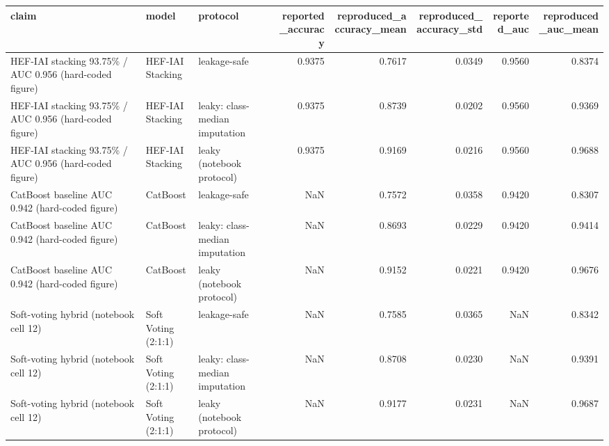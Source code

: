 \begin{tabular}{lllrrrrr}
\toprule
claim & model & protocol & reported\_accuracy & reproduced\_accuracy\_mean & reproduced\_accuracy\_std & reported\_auc & reproduced\_auc\_mean \\
\midrule
HEF-IAI stacking 93.75\% / AUC 0.956 (hard-coded figure) & HEF-IAI Stacking & leakage-safe & 0.9375 & 0.7617 & 0.0349 & 0.9560 & 0.8374 \\
HEF-IAI stacking 93.75\% / AUC 0.956 (hard-coded figure) & HEF-IAI Stacking & leaky: class-median imputation & 0.9375 & 0.8739 & 0.0202 & 0.9560 & 0.9369 \\
HEF-IAI stacking 93.75\% / AUC 0.956 (hard-coded figure) & HEF-IAI Stacking & leaky (notebook protocol) & 0.9375 & 0.9169 & 0.0216 & 0.9560 & 0.9688 \\
CatBoost baseline AUC 0.942 (hard-coded figure) & CatBoost & leakage-safe & NaN & 0.7572 & 0.0358 & 0.9420 & 0.8307 \\
CatBoost baseline AUC 0.942 (hard-coded figure) & CatBoost & leaky: class-median imputation & NaN & 0.8693 & 0.0229 & 0.9420 & 0.9414 \\
CatBoost baseline AUC 0.942 (hard-coded figure) & CatBoost & leaky (notebook protocol) & NaN & 0.9152 & 0.0221 & 0.9420 & 0.9676 \\
Soft-voting hybrid (notebook cell 12) & Soft Voting (2:1:1) & leakage-safe & NaN & 0.7585 & 0.0365 & NaN & 0.8342 \\
Soft-voting hybrid (notebook cell 12) & Soft Voting (2:1:1) & leaky: class-median imputation & NaN & 0.8708 & 0.0230 & NaN & 0.9391 \\
Soft-voting hybrid (notebook cell 12) & Soft Voting (2:1:1) & leaky (notebook protocol) & NaN & 0.9177 & 0.0231 & NaN & 0.9687 \\
\bottomrule
\end{tabular}
